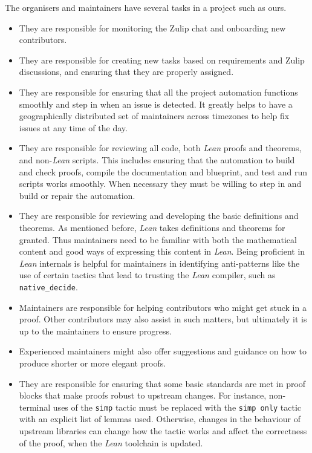 The organisers and maintainers have several tasks in a project such as ours.
\begin{itemize}
    \item They are responsible for monitoring the Zulip chat and onboarding new contributors.
    \item They are responsible for creating new tasks based on requirements and Zulip discussions, and ensuring that they are properly assigned.
    \item They are responsible for ensuring that all the project automation functions smoothly and step in when an issue is detected. It greatly helps to have a geographically distributed set of maintainers across timezones to help fix issues at any time of the day.
    \item They are responsible for reviewing all code, both \emph{Lean} proofs and theorems, and non-\emph{Lean} scripts. This includes ensuring that the automation to build and check proofs, compile the documentation and blueprint, and test and run scripts works smoothly. When necessary they must be willing to step in and build or repair the automation.
    \item They are responsible for reviewing and developing the basic definitions and theorems. As mentioned before, \emph{Lean} takes definitions and theorems for granted. Thus maintainers need to be familiar with both the mathematical content and good ways of expressing this content in \emph{Lean}. Being proficient in \emph{Lean} internals is helpful for maintainers in identifying anti-patterns like the use of certain tactics that lead to trusting the \emph{Lean} compiler, such as \texttt{native\_decide}.
    \item Maintainers are responsible for helping contributors who might get stuck in a proof. Other contributors may also assist in such matters, but ultimately it is up to the maintainers to ensure progress.
    \item Experienced maintainers might also offer suggestions and guidance on how to produce shorter or more elegant proofs.
    \item They are responsible for ensuring that some basic standards are met in proof blocks that make proofs robust to upstream changes. For instance, non-terminal uses of the \texttt{simp} tactic must be replaced with the \texttt{simp only} tactic with an explicit list of lemmas used. Otherwise, changes in the behaviour of upstream libraries can change how the tactic works and affect the correctness of the proof, when the \emph{Lean} toolchain is updated.

\end{itemize}
